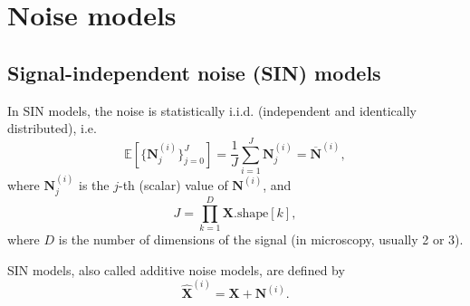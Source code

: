 \documentclass{article}
\begin{document}
\section{Noise models}
\label{sec:noise_models}

\subsection{Signal-independent noise (SIN) models}
In SIN models, the noise is statistically i.i.d. (independent and
identically distributed), i.e.
\begin{equation}
  {\mathbb E}[\{{\mathbf N}^{(i)}_j\}_{j=0}^J]=\frac{1}{J} \sum_{i=1}^J {\mathbf N}_j^{(i)}=\overline{\mathbf N}^{(i)},
  \label{eq:noise_expectation_1}
\end{equation}
where ${\mathbf N}^{(i)}_j$ is the $j$-th (scalar) value
of ${\mathbf N}^{(i)}$, and
\begin{equation}
  J=\prod_{k=1}^D \mathbf{X}.\text{shape}[k],
\end{equation}
where $D$ is the number of dimensions of the signal (in microscopy, usually 2 or 3).

SIN models, also called additive noise models, are defined by
\begin{equation}
  \hat{\mathbf X}^{(i)} = {\mathbf X} + {\mathbf N}^{(i)}.
  \label{eq:additive_noisy_model}
\end{equation}
\end{document}
